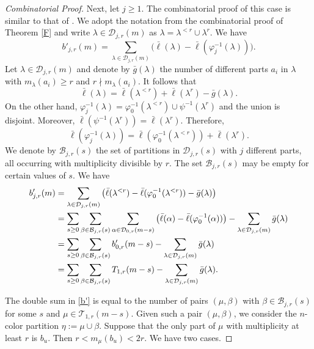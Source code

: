 \documentclass[reqno,12pt]{amsart}
\theoremstyle{definition}
\begin{document}
\begin{proof}[Combinatorial Proof]
Next, let $j\geq 1$. The combinatorial proof of this case is similar to that of \cite[Theorem 6]{BW21}. We adopt the notation from the combinatorial proof of Theorem \ref{F} and write $\lambda\in \mathcal D_{j,r}(m)$ as $\lambda= \lambda^{<r}\cup \lambda^r$. We have 
$$b'_{j,r}(m)=\sum_{\lambda\in \mathcal D_{j,r}(m)}\Big(\bar\ell(\lambda)-\bar\ell(\varphi_j^{-1}(\lambda))\Big).$$ 
Let $\lambda \in \mathcal{D}_{j,r}(m)$ and denote by $\bar g(\lambda)$ the number of different parts $a_i$ in $\lambda$ with $m_\lambda(a_i)\geq r$ and $r\nmid m_\lambda(a_i)$. It follows that 
$$\bar\ell(\lambda)=\bar\ell(\lambda^{<r})+\bar\ell(\lambda^r)-\bar g(\lambda).$$ 
On the other hand, $\varphi_j^{-1}(\lambda)=\varphi_0^{-1}(\lambda^{<r})\cup \psi^{-1}(\lambda^r)$ and the union is disjoint. Moreover, $\bar\ell(\psi^{-1}(\lambda^r))=\bar\ell(\lambda^r)$. Therefore, 
$$\bar\ell(\varphi_j^{-1}(\lambda))=\bar\ell(\varphi_0^{-1}(\lambda^{<r}))+\bar\ell(\lambda^{r}).$$
We denote by $\mathcal B_{j,r}(s)$ the set of partitions in $\mathcal D_{j,r}(s)$ with $j$ different parts, all occurring with multiplicity divisible by $r$. The set $\mathcal B_{j,r}(s)$ may be empty for certain values of $s$. We have 
\begin{align}
b'_{j,r}(m)& \notag =\sum_{\lambda\in \mathcal D_{j,r}(m)}
\left(\bar\ell(\lambda^{<r})-\bar\ell(\varphi_0^{-1}(\lambda^{<r}))-\bar g(\lambda)\right)\\ 
& \notag =\sum_{s\geq 0}\sum_{\beta\in \mathcal B_{j,r}(s)} \sum_{\alpha\in \mathcal D_{0,r}(m-s)}\left( \bar\ell(\alpha)-\bar\ell(\varphi_0^{-1}(\alpha))\right)-\sum_{\lambda\in \mathcal D_{j,r}(m)} \bar g(\lambda)\\
\notag & =\sum_{s\geq 0}\sum_{\beta\in \mathcal B_{j,r}(s)}b'_{0,r}(m-s)-\sum_{\lambda\in \mathcal D_{j,r}(m)} \bar g(\lambda)\\ 
\label{b'} & = \sum_{s\geq 0}\sum_{\beta\in \mathcal B_{j,r}(s)}T_{1,r}(m-s)-\sum_{\lambda\in \mathcal D_{j,r}(m)} \bar g(\lambda).
\end{align}

The double sum in \eqref{b'} is equal to the  number of pairs $(\mu, \beta)$ with $\beta\in \mathcal B_{j,r}(s)$ for some $s$ and $\mu \in \mathcal T_{1,r}(m-s)$. Given such a pair $(\mu, \beta)$, we consider the $n$-color partition $\eta:=\mu\cup \beta$. Suppose that the only part of $\mu$ with multiplicity at least $r$ is $b_u$. Then $r<m_\mu(b_u)<2r$. We have two cases. 


\end{proof}
\end{document}
